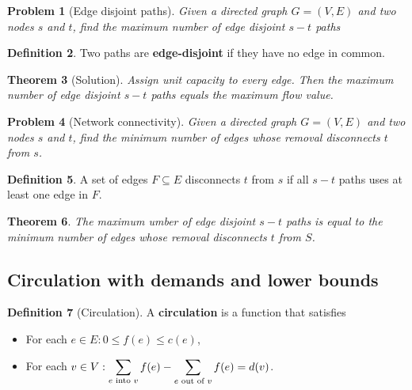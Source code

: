 \documentclass[10pt, oneside, reqno]{amsart}
\theoremstyle{plain}%
\newtheorem{thm}{Theorem}[section]
\newtheorem{prob}[thm]{Problem}
\theoremstyle{definition}
\newtheorem{defn}[thm]{Definition}
\theoremstyle{remark}
\begin{document}
\begin{prob}[Edge disjoint paths]
    Given a directed graph $G = (V,E)$ and two nodes $s$ and $t$, find the maximum number of edge disjoint $s-t$ paths
\end{prob}

\begin{defn}
    Two paths are \textbf{edge-disjoint} if they have no edge in common.
\end{defn}

\begin{thm}[Solution]
    Assign unit capacity to every edge.  Then the maximum number of edge disjoint $s-t$ paths equals the maximum flow value.
\end{thm}

\begin{prob}[Network connectivity]
    Given a directed graph $G = (V,E)$ and two nodes $s$ and $t$, find the minimum number of edges whose removal disconnects $t$ from $s$.
\end{prob}

\begin{defn}
    A set of edges $F \subseteq E$ disconnects $t$ from $s$ if all $s-t$ paths uses at least one edge in $F$.
\end{defn}

\begin{thm}
    The maximum umber of edge disjoint $s-t$ paths is equal to the minimum number of edges whose removal disconnects $t$ from $S$.  
\end{thm}







\subsection{Circulation with demands and lower bounds} %
\label{sub:circulation_with_demands_and_lower_bounds}

\begin{defn}[Circulation]
    A \textbf{circulation} is a function that satisfies 
    \begin{itemize}
        \item For each $e \in E: 0 \leq f(e) \leq c(e)$,
        
        \item For each $v \in V: \displaystyle\sum_{\text{$e$ into $v$}} f(e) - \displaystyle\sum_{\text{$e$ out of $v$}}f(e) = d(v)$.
    \end{itemize}
\end{defn}
\end{document}
